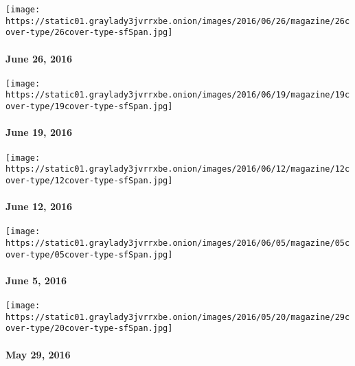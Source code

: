 \href{http://www.nytimes3xbfgragh.onion/indexes/2016/06/26/magazine/index.html}{}

\texttt{[image: https://static01.graylady3jvrrxbe.onion/images/2016/06/26/magazine/26cover-type/26cover-type-sfSpan.jpg]}

\hypertarget{june-26-2016}{%
\paragraph{June 26, 2016}\label{june-26-2016}}

\href{http://www.nytimes3xbfgragh.onion/indexes/2016/06/19/magazine/index.html}{}

\texttt{[image: https://static01.graylady3jvrrxbe.onion/images/2016/06/19/magazine/19cover-type/19cover-type-sfSpan.jpg]}

\hypertarget{june-19-2016}{%
\paragraph{June 19, 2016}\label{june-19-2016}}

\href{http://www.nytimes3xbfgragh.onion/indexes/2016/06/12/magazine/index.html}{}

\texttt{[image: https://static01.graylady3jvrrxbe.onion/images/2016/06/12/magazine/12cover-type/12cover-type-sfSpan.jpg]}

\hypertarget{june-12-2016}{%
\paragraph{June 12, 2016}\label{june-12-2016}}

\href{http://www.nytimes3xbfgragh.onion/indexes/2016/06/05/magazine/index.html}{}

\texttt{[image: https://static01.graylady3jvrrxbe.onion/images/2016/06/05/magazine/05cover-type/05cover-type-sfSpan.jpg]}

\hypertarget{june-5-2016}{%
\paragraph{June 5, 2016}\label{june-5-2016}}

\href{http://www.nytimes3xbfgragh.onion/indexes/2016/05/29/magazine/index.html}{}

\texttt{[image: https://static01.graylady3jvrrxbe.onion/images/2016/05/20/magazine/29cover-type/20cover-type-sfSpan.jpg]}

\hypertarget{may-29-2016}{%
\paragraph{May 29, 2016}\label{may-29-2016}}

